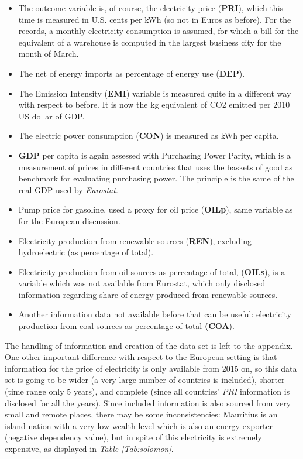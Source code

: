 \documentclass[a4paper,12pt]{book}
\begin{document}
\begin{itemize}
\item The outcome variable is, of course, the electricity price (\textbf{PRI}), which this time is measured in U.S. cents per kWh (so not in Euros as before). For the records, a monthly electricity consumption is assumed, for which a bill for the equivalent of a warehouse is computed in the largest business city for the month of March.
\item The net of energy imports as percentage of energy use (\textbf{DEP}).
\item The Emission Intensity (\textbf{EMI}) variable is measured quite in a different way with respect to before. It is now the kg equivalent of CO2 emitted per 2010 US dollar of GDP.
\item The electric power consumption (\textbf{CON}) is measured as kWh per capita.
\item \textbf{GDP} per capita is again assessed with Purchasing Power Parity, which is a measurement of prices in different countries that uses the baskets of good as benchmark for evaluating purchasing power. The principle is the same of the real GDP used by \textit{Eurostat}.
\item Pump price for gasoline, used a proxy for oil price (\textbf{OILp}), same variable as for the European discussion.
\item Electricity production from renewable sources (\textbf{REN}), excluding hydroelectric (as percentage of total).
\item Electricity production from oil sources as percentage of total, (\textbf{OILs}), is a variable which was not available from Eurostat, which only disclosed information regarding share of energy produced from renewable sources.
\item Another information data not available before that can be useful: electricity production from coal sources as percentage of total \textbf{(COA}).
\end{itemize}

The handling of information and creation of the data set is left to the appendix. One other important difference with respect to the European setting is that information for the price of electricity is only available from 2015 on, so this data set is going to be wider (a very large number of countries is included), shorter (time range only $5$ years), and complete (since all countries' \textit{PRI} information is disclosed for all the years). Since included information is also sourced from very small and remote places, there may be some inconsistencies: Mauritius is an island nation with a very low wealth level which is also an energy exporter (negative dependency value), but in spite of this electricity is extremely expensive, as displayed in \textit{Table \ref{Tab:solomon}}.
\end{document}
